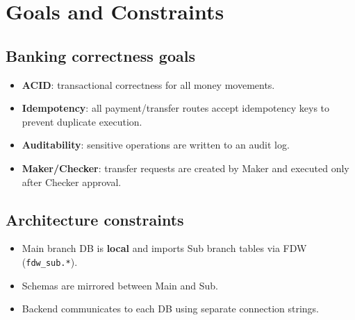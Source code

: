 \section{Goals and Constraints}
\subsection{Banking correctness goals}
\begin{itemize}[nosep]
  \item \textbf{ACID}: transactional correctness for all money movements.
  \item \textbf{Idempotency}: all payment/transfer routes accept idempotency keys to prevent duplicate execution.
  \item \textbf{Auditability}: sensitive operations are written to an audit log.
  \item \textbf{Maker/Checker}: transfer requests are created by Maker and executed only after Checker approval.
\end{itemize}

\subsection{Architecture constraints}
\begin{itemize}[nosep]
  \item Main branch DB is \textbf{local} and imports Sub branch tables via FDW (\texttt{fdw\_sub.*}).
  \item Schemas are mirrored between Main and Sub.
  \item Backend communicates to each DB using separate connection strings.
\end{itemize}
